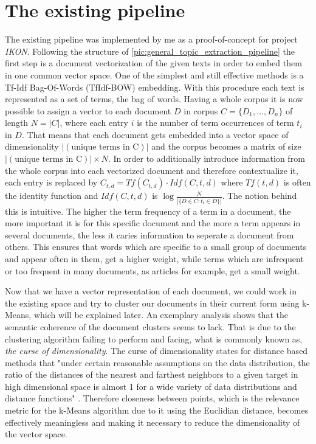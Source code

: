 \section{The existing pipeline}

The existing pipeline was implemented by me as a proof-of-concept for project \textit{IKON}. Following the structure of \autoref{pic:general_topic_extraction_pipeline} the first step is a document vectorization of the given texts in order to embed them in one common vector space. One of the simplest and still effective methods is a Tf-Idf Bag-Of-Words (TfIdf-BOW) embedding. With this procedure each text is represented as a set of terms, the bag of words. Having a whole corpus it is now possible to assign a vector to each document $D$ in corpus $C=\{D_1, ..., D_n\}$ of length $N = |C|$, where each entry $i$ is the number of term occurrences of term $t_i$ in $D$. That means that each document gets embedded into a vector space of dimensionality $|(\text{unique terms in C})|$ and the corpus becomes a matrix of size $|(\text{unique terms in C})| \times N$. In order to additionally introduce information from the whole corpus into each vectorized document and therefore contextualize it, each entry is replaced by $C_{t,d}=Tf(C_{t,d}) \cdot Idf(C,t,d)$ where $Tf(t,d)$ is often the identity function and $Idf(C,t,d)$ is $\log\frac{N}{|\{ D \in C : t_t \in D \}|}$. \cite{PivotedDocumentLength} The notion behind this is intuitive. The higher the term frequency of a term in a document, the more important it is for this specific document and the more a term appears in several documents, the less it caries information to seperate a document from others.  This ensures that words which are specific to a small group of documents and appear often in them, get a higher weight, while terms which are infrequent or too frequent in many documents, as articles for example, get a small weight.

Now that we have a vector representation of each document, we could work in the existing space and try to cluster our documents in their current form using k-Means, which will be explained later. An exemplary analysis shows that the semantic coherence of the document clusters seems to lack.  That is due to the clustering algorithm failing to perform and facing, what is commonly known as, \textit{the curse of dimensionality}. The curse of dimensionality states for distance based methods that "under certain reasonable assumptions on the
data distribution, the ratio of the distances of the nearest and farthest neighbors
to a given target in high dimensional space is almost 1 for a wide variety of data
distributions and distance functions" \cite{aggarwalSurprisingBehaviorDistance2001}. Therefore closeness between points, which is the relevance metric for the k-Means algorithm due to it using the Euclidian distance, becomes effectively meaningless and making it necessary to reduce the dimensionality of the vector space.

